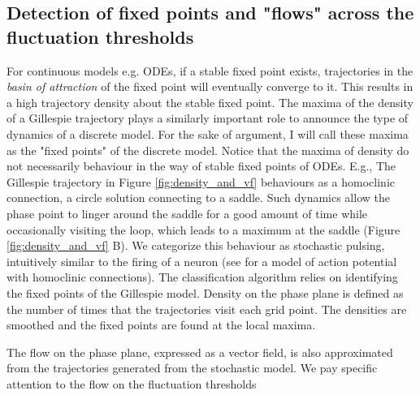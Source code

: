 

\subsection{Detection of fixed points and "flows" across the fluctuation thresholds}
\label{sec:detecting_fp}
%
For continuous models e.g. ODEs, if a stable fixed point exists,
trajectories in the \emph{basin of attraction} of the fixed point will eventually
converge to it.
This results in a high trajectory density about the stable fixed point.
The maxima of the density of a Gillespie trajectory plays a similarly important
role to announce the type of dynamics of a discrete model.
For the sake of argument, I will call these maxima as the "fixed points" of
the discrete model.
Notice that the maxima of density do not necessarily behaviour in the way
of stable fixed points of ODEs.
E.g., The Gillespie trajectory in Figure \ref{fig:density_and_vf} behaviours as a homoclinic
connection, a circle solution connecting to a saddle.
Such dynamics allow the phase point to linger around the saddle for a good amount
of time while occasionally visiting the loop, which leads to a maximum at the saddle
(Figure \ref{fig:density_and_vf} B).
We categorize this behaviour as stochastic pulsing, intuitively similar to the firing
of a neuron (see \cite{hesse22} for a model of action potential with homoclinic connections).
%
The classification algorithm relies on identifying the fixed points of the
Gillespie model. Density on the phase plane is defined as the number of times that
the trajectories visit each grid point. The densities are smoothed and
the fixed points are found at the local maxima.

The flow on the phase plane, expressed as a vector field,
is also approximated from the trajectories generated
from the stochastic model. We pay specific attention to the flow on the fluctuation thresholds

